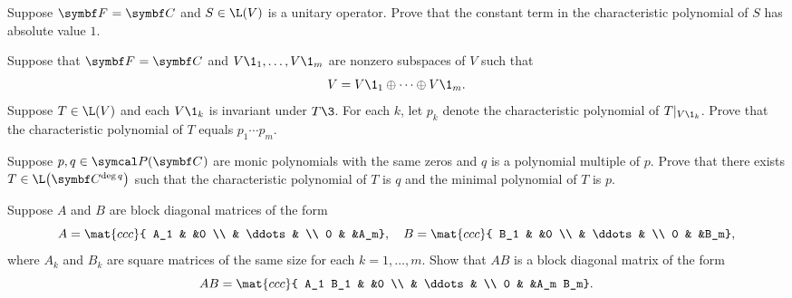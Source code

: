 \begin{exercises}
\exercise
Suppose $\F{} = \C{}$ and $S \in \L(V)$ is a unitary operator. Prove that the constant term in the characteristic polynomial of $S$ has absolute value $1$.

\exercise
Suppose that $\F{} = \C{}$ and $V\1_1, \dots, V\1_m$ are nonzero subspaces of $V$ such that
\[
V = V\1_1 \oplus \dots \oplus V\1_m.
\]
Suppose $T \in \L(V)$ and each $V\1_k$ is invariant under $T\3$. For each $k$, let $p_k$ denote the characteristic polynomial of $T|_{V\1_k}$. Prove that
the characteristic polynomial of $T$ equals $p_1 \dotsm p_m$.


\exercise
Suppose $p, q \in \P(\C{})$ are monic polynomials with the same zeros and $q$ is a polynomial multiple of $p$. Prove that there exists $T \in \L\paren[\big]{\C{\deg q}}$ such that the characteristic polynomial of $T$ is $q$ and the minimal polynomial of $T$ is $p$.


\exercise
Suppose $A$ and $B$ are block diagonal matrices of the form\label{blockmult}
\[
A = \mat{ccc}{
A_1 & &0 \\
& \ddots & \\
0 & &A_m},
\quad B = \mat{ccc}{
B_1 & &0 \\
& \ddots & \\
0 & &B_m},
\]
where $A_k$ and $B_k$ are square matrices of the same size for each $k = 1, \dots, m$. Show that $AB$ is a
block diagonal matrix of the form
\[
AB = \mat{ccc}{
A_1 B_1 & &0 \\
& \ddots & \\
0 & &A_m B_m}.
\]



\end{exercises}
